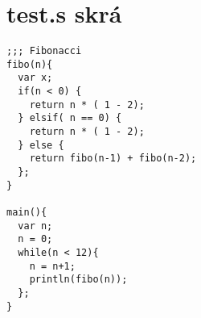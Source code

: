 \documentclass[]{article}
\begin{document}
\pagebreak

\section*{test.s skrá}

\begin{lstlisting}
;;; Fibonacci
fibo(n){
  var x;
  if(n < 0) {
    return n * ( 1 - 2); 
  } elsif( n == 0) { 
    return n * ( 1 - 2);
  } else {
    return fibo(n-1) + fibo(n-2);
  };
}

main(){
  var n;
  n = 0;
  while(n < 12){
    n = n+1;
    println(fibo(n));
  };
}
\end{lstlisting}
\end{document}

